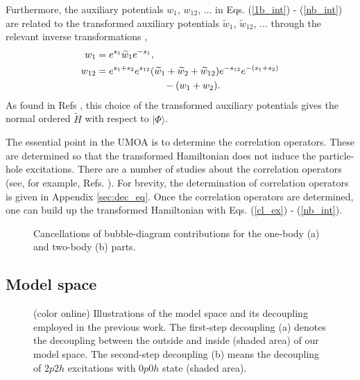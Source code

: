 \documentclass[aps,prc, dvips, twocolumn,groupedaddress,showkeys,showpacs,floatfix,superscriptaddress]{revtex4-1}
\newcommand{\<}{\langle}
\renewcommand{\>}{\rangle}
\begin{document}
Furthermore, the auxiliary potentials $w_{1}$, $w_{12}$, $\dots$ in
 Eqs. (\ref{1b_int}) - (\ref{nb_int}) are related to the transformed
 auxiliary potentials $\widetilde{w}_{1}$, $\widetilde{w}_{12}$, $\dots$
  through the relevant inverse transformations
 \cite{Suzuki:1988,Suzuki:1992},
\begin{align}
 w_{1}&=e^{s_{1}}\widetilde{w}_{1}e^{-s_{1}}, \\
 w_{12} &=e^{s_{1}+s_{2}}e^{s_{12}}(\widetilde{w}_{1}+\widetilde{w}_{2}
 + \widetilde{w}_{12})e^{-s_{12}}e^{-(s_{1}+s_{2})} \notag \\
 &\hspace{7em} - (w_{1}+w_{2}).
\end{align}
As found in Refs \cite{Suzuki:1988,Suzuki:1992,Kohno:2012}, this choice of the transformed
 auxiliary potentials gives the normal ordered $\widetilde{H}$ with respect to $|\Phi\>$.

The essential point in the UMOA is to determine the correlation operators.
These are determined so that the transformed Hamiltonian does not
 induce the particle-hole excitations.
 There are a number of studies about the correlation operators (see, for example, Refs. \cite{Shavitt:1980, Westhaus:1981, Suzuki:1982}).
 For brevity, the determination of correlation operators is given in Appendix \ref{sec:dec_eq}.
Once the correlation operators are determined,
one can build up the transformed Hamiltonian with Eqs. (\ref{cl_ex}) - (\ref{nb_int}).


\begin{figure*}[t]
\caption{\label{bubble:fig}Cancellations of bubble-diagram contributions for the one-body (a) and two-body (b) parts.}
\end{figure*}


\subsection{Model space \label{sec:model}}
\begin{figure}[t]
\caption{\label{tri}(color online) Illustrations of the model space and its decoupling employed in the previous work.
 The first-step decoupling (a) denotes the decoupling between the outside and inside (shaded area) of
  our model space.
The second-step decoupling (b) means the decoupling of $2p2h$ excitations with $0p0h$ state (shaded area).}
\end{figure}
\end{document}
